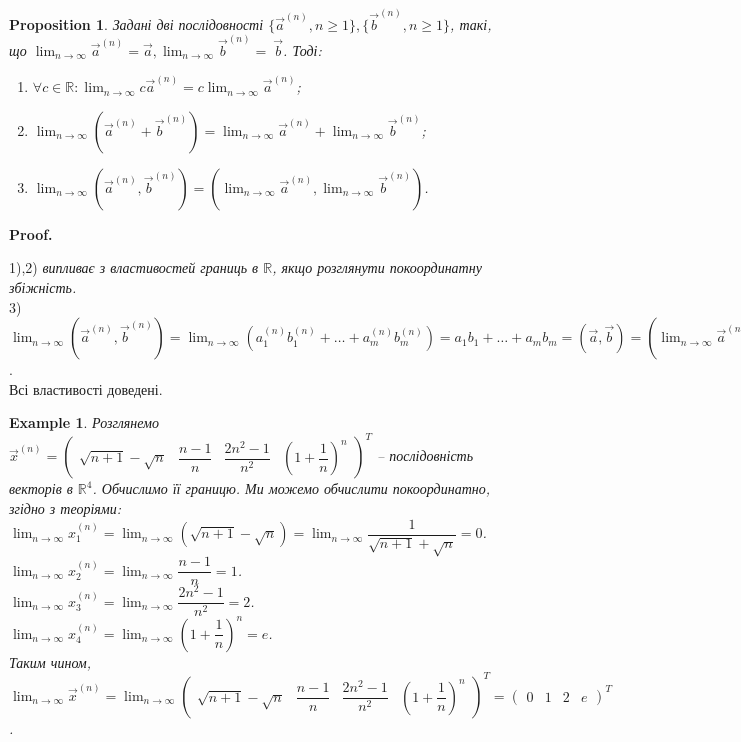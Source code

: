 \documentclass[a4paper, 10pt]{article}
\makeatletter
\def\huge{\displaystyle}
\def\qed{$\blacksquare$}
\theoremstyle{theoremdd}
\theoremstyle{theoremdd}
\theoremstyle{theoremdd}
\theoremstyle{theoremdd}
\theoremstyle{theoremdd}
\newtheorem{example}[theorem]{Example}
\theoremstyle{theoremdd}
\newtheorem{proposition}[theorem]{Proposition}
\theoremstyle{theoremdd}
\theoremstyle{theoremdd}
\theoremstyle{theoremdd}
\renewenvironment{proof}[1][Proof.\\]{\par
\pushQED{\hfill \qed}%
\normalfont \topsep6\p@\@plus6\p@\relax
\trivlist
\item\relax
{\bfseries
#1\@addpunct{.}}\hspace\labelsep\ignorespaces
}{%
\popQED\endtrivlist\@endpefalse
}
\makeatother
\begin{document}
\begin{proposition}
Задані дві послідовності $\{\vec{a}^{(n)}, n \geq 1\}, \{\vec{b}^{(n)}, n \geq 1\}$, такі, що $\huge \lim_{n \to \infty} \vec{a}^{(n)} = \vec{a}, \lim_{n \to \infty} \vec{b}^{(n)} = ~{\vec{b}}$. Тоді:
\begin{enumerate}[nosep,wide=0pt,label={\arabic*)}]
\item $\forall c \in \mathbb{R}: \huge \lim_{n \to \infty} c \vec{a}^{(n)} = c \lim_{n \to \infty} \vec{a}^{(n)}$;
\item $\huge \lim_{n \to \infty} (\vec{a}^{(n)} + \vec{b}^{(n)}) = \lim_{n \to \infty} \vec{a}^{(n)} + \lim_{n \to \infty} \vec{b}^{(n)}$;
\item $\huge \lim_{n \to \infty} (\vec{a}^{(n)}, \vec{b}^{(n)}) = \left(\lim_{n \to \infty} \vec{a}^{(n)}, \lim_{n \to \infty} \vec{b}^{(n)}\right)$.
\end{enumerate}
\end{proposition}
\begin{proof}
1),2) \textit{випливає з властивостей границь в $\mathbb{R}$, якщо розглянути покоординатну збіжність.}
\bigskip \\
3) $\huge \lim_{n \to \infty} (\vec{a}^{(n)}, \vec{b}^{(n)}) = \lim_{n \to \infty} (a_1^{(n)}b_1^{(n)} + \dots + a_m^{(n)}b_m^{(n)}) = a_1b_1 + \dots + a_m b_m = (\vec{a}, \vec{b}) = \left(\lim_{n \to \infty} \vec{a}^{(n)}, \lim_{n \to \infty} \vec{b}^{(n)}\right)$.\\
Всі властивості доведені.
\end{proof}

\begin{example}
Розглянемо $\vec{x}^{(n)} = \begin{pmatrix}
\sqrt{n+1}-\sqrt{n} & \dfrac{n-1}{n} & \dfrac{2n^2-1}{n^2} & \left( 1 + \dfrac{1}{n} \right)^n
\end{pmatrix}^T$ -- послідовність векторів в $\mathbb{R}^4$. Обчислимо її границю. Ми можемо обчислити покоординатно, згідно з теоріями:\\
$\huge\lim_{n \to \infty} x_1^{(n)} = \lim_{n \to \infty} (\sqrt{n+1}-\sqrt{n}) = \lim_{n \to \infty} \dfrac{1}{\sqrt{n+1}+\sqrt{n}} = 0$.\\
$\huge\lim_{n \to \infty} x_2^{(n)} = \lim_{n \to \infty} \dfrac{n-1}{n} = 1$.\\
$\huge\lim_{n \to \infty} x_3^{(n)} = \lim_{n \to \infty} \dfrac{2n^2-1}{n^2} = 2$.\\
$\huge\lim_{n \to \infty} x_4^{(n)} = \lim_{n \to \infty} \left( 1 + \dfrac{1}{n}\right)^n = e$.\\
Таким чином, $\huge\lim_{n \to \infty} \vec{x}^{(n)} = \lim_{n \to \infty} \begin{pmatrix}
\sqrt{n+1}-\sqrt{n} & \dfrac{n-1}{n} & \dfrac{2n^2-1}{n^2} & \left( 1 + \dfrac{1}{n} \right)^n
\end{pmatrix}^T = \begin{pmatrix}
0 & 1 & 2 & e
\end{pmatrix}^T$.
\end{example}
\end{document}
